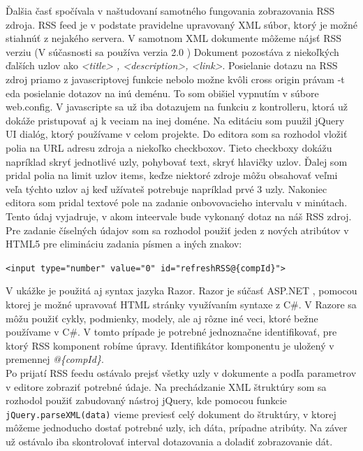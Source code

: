 \documentclass[11pt, oneside]{report}
\begin{document}
Ďalšia časť spočívala v naštudovaní samotného fungovania zobrazovania RSS zdroja. RSS feed je v podstate pravidelne upravovaný XML súbor, ktorý je možné stiahnúť z nejakého servera. V samotnom XML dokumente môžeme nájsť RSS verziu (V súčasnosti sa používa verzia 2.0 ) Dokument pozostáva z niekoľkých ďalších uzlov ako \textit{<title> , <description>, <link>}. Posielanie dotazu na RSS zdroj priamo z javascriptovej funkcie nebolo možne kvôli cross origin právam -t eda posielanie  dotazov na inú deménu. To som obišiel vypnutím v súbore web.config. V javascripte sa už iba dotazujem na funkciu z kontrolleru, ktorá  už dokáže pristupovať aj k veciam  na inej doméne. Na editáciu som puužil jQuery UI dialóg, ktorý používame v celom projekte. Do editora som sa rozhodol vložiť polia na URL adresu zdroja a niekoľko checkboxov. Tieto checkboxy dokážu napríklad skryť jednotlivé  uzly,  pohybovať text, skryť hlavičky uzlov. Ďalej som pridal polia na limit uzlov items, keďze niektoré zdroje môžu obsahovať veľmi veľa týchto uzlov aj keď užívateš potrebuje napríklad prvé 3 uzly. Nakoniec editora som pridal textové pole na zadanie onbovovacieho intervalu v minútach. Tento údaj vyjadruje, v akom inteervale bude vykonaný dotaz na náš RSS zdroj. Pre zadanie číselných údajov som sa rozhodol použiť jeden z nových atribútov  v HTML5 pre elimináciu zadania písmen a iných znakov:
\begin{center}
\lstset{language=Html}
\lstinline!<input type="number" value="0" id="refreshRSS@{compId}">!\\
\end{center}
V ukážke je použitá aj syntax jazyka Razor. Razor je súčasť ASP.NET , pomocou ktorej je možné upravovať HTML stránky využívaním syntaxe z C\#. V Razore  sa môžu použiť cykly, podmienky, modely, ale aj rôzne iné veci, ktoré bežne používame v C\#. V tomto prípade je potrebné jednoznačne identifikovať, pre ktorý RSS komponent robíme úpravy. Identifikátor komponentu je uložený v premennej \textit{@\{compId\}}.\\
Po prijatí RSS feedu ostávalo prejsť všetky uzly v dokumente a podľa parametrov v editore  zobraziť potrebné údaje. Na prechádzanie  XML štruktúry som sa rozhodol použiť zabudovaný nástroj jQuery, kde pomocou funkcie 
\lstset{language=Javascript}
\lstinline!jQuery.parseXML(data)!
vieme previesť  celý dokument do štruktúry, v ktorej môžeme jednoducho  dostať potrebné uzly, ich dáta, prípadne atribúty. Na záver už ostávalo iba skontrolovať interval dotazovania a doladiť zobrazovanie dát.\\
\end{document}
